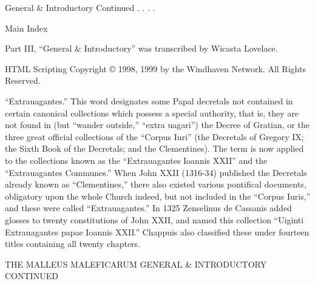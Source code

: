                                          General & Introductory Continued . . . .

                                                        Main Index


                                                 Part III, “General & Introductory”
                                               was transcribed by Wicasta Lovelace.

                            HTML Scripting Copyright © 1998, 1999 by the Windhaven Network.
                                                  All Rights Reserved.



            “Extrauagantes.” This word designates some Papal decretals not contained in certain
        canonical collections which possess a special authority, that is, they are not found in (but
        “wander outside,” “extra uagari”) the Decree of Gratian, or the three great official
        collections of the “Corpus Iuri” (the Decretals of Gregory IX; the Sixth Book of the
        Decretals; and the Clementines). The term is now applied to the collections known as the
        “Extrauagantes Ioannis XXII” and the “Extrauagantes Communes.” When John XXII
        (1316-34) published the Decretals already known as “Clementines,” there also existed
        various pontifical documents, obligatory upon the whole Church indeed, but not included in
        the “Corpus Iuris,” and these were called “Extrauagantes.” In 1325 Zenselinus de
        Cassanis added glosses to twenty constitutions of John XXII, and named this collection
        “Uiginti Extrauagantes papae Ioannis XXII.” Chappuis also classified these under fourteen
        titles containing all twenty chapters.




                                  THE
                          MALLEUS MALEFICARUM
                                         GENERAL & INTRODUCTORY CONTINUED

